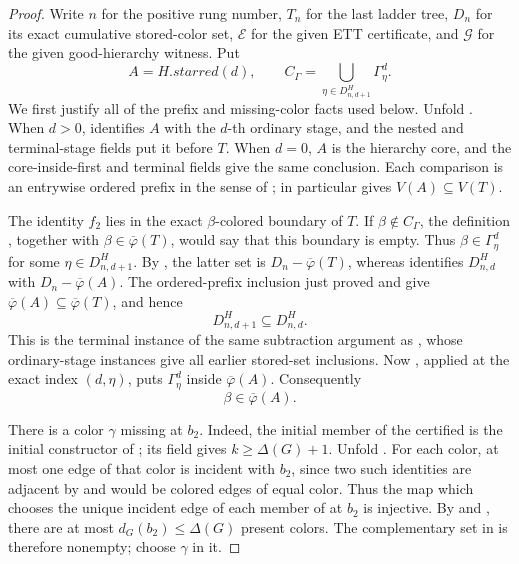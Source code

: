 \begin{proof}
Write $n$ for the positive rung number, $T_n$ for the last ladder tree,
$D_n$ for its exact cumulative stored-color set, $\mathcal E$ for the
given ETT certificate, and $\mathcal G$ for the given good-hierarchy
witness.  Put
\[
 A=H.\mathit{starred}(d),\qquad
 C_\Gamma=\bigcup_{\eta\in D^H_{n,d+1}}\Gamma^d_\eta.
\]
We first justify all of the prefix and missing-color facts used below.
Unfold .  When $d>0$,
 identifies $A$ with the $d$-th ordinary
stage, and the nested and terminal-stage fields put it before $T$.  When
$d=0$, $A$ is the hierarchy core, and the core-inside-first and terminal
fields give the same conclusion.  Each comparison is an entrywise
ordered prefix in the sense of ; in
particular  gives $V(A)\subseteq V(T)$.

The identity $f_2$ lies in the exact $\beta$-colored boundary of $T$.
If $\beta\notin C_\Gamma$, the definition
, together with
$\beta\in\overline\varphi(T)$, would say that this boundary is empty.
Thus $\beta\in\Gamma^d_\eta$ for some
$\eta\in D^H_{n,d+1}$.  By
, the latter set is
$D_n-\overline\varphi(T)$, whereas
 identifies $D^H_{n,d}$ with
$D_n-\overline\varphi(A)$.  The ordered-prefix inclusion just proved and
 give
$\overline\varphi(A)\subseteq\overline\varphi(T)$, and hence
\[
                 D^H_{n,d+1}\subseteq D^H_{n,d}.              \tag{1}
\]
This is the terminal instance of the same subtraction argument as
, whose ordinary-stage instances
give all earlier stored-set inclusions.  Now
, applied at the exact index
$(d,\eta)$, puts $\Gamma^d_\eta$ inside
$\overline\varphi(A)$.  Consequently
\[
                       \beta\in\overline\varphi(A).           \tag{2}
\]

There is a color $\gamma$ missing at $b_2$.  Indeed, the initial member
of the certified  is the initial constructor of
; its  field gives
$k\geq\Delta(G)+1$.  Unfold .  For each
color, at most one edge of that color is incident with $b_2$, since two
such identities are adjacent by  and would be
colored edges of equal color.  Thus the
map which chooses the unique incident edge of each member of
 at $b_2$ is injective.  By  and
, there are at most
$d_G(b_2)\leq\Delta(G)$ present colors.  The complementary set in
 is therefore nonempty; choose $\gamma$ in it.


\end{proof}
